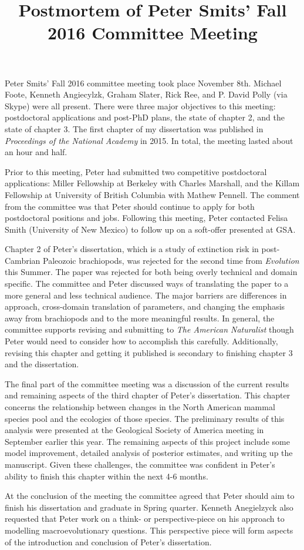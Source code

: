 \documentclass{article}
\title{Postmortem of Peter Smits' Fall 2016 Committee Meeting}
\date{}
\begin{document}
\linenumbers
\modulolinenumbers[2]

\maketitle

Peter Smits' Fall 2016 committee meeting took place November 8th. Michael Foote, Kenneth Angiecylzk, Graham Slater, Rick Ree, and P. David Polly (via Skype) were all present. There were three major objectives to this meeting: postdoctoral applications and post-PhD plans, the state of chapter 2, and the state of chapter 3. The first chapter of my dissertation was published in \textit{Proceedings of the National Academy} in 2015. In total, the meeting lasted about an hour and half. 

Prior to this meeting, Peter had submitted two competitive postdoctoral applications: Miller Fellowship at Berkeley with Charles Marshall, and the Killam Fellowship at University of British Columbia with Mathew Pennell. The comment from the committee was that Peter should continue to apply for both postdoctoral positions and jobs. Following this meeting, Peter contacted Felisa Smith (University of New Mexico) to follow up on a soft-offer presented at GSA.

Chapter 2 of Peter's dissertation, which is a study of extinction risk in post-Cambrian Paleozoic brachiopods, was rejected for the second time from \textit{Evolution} this Summer. The paper was rejected for both being overly technical and domain specific. The committee and Peter discussed ways of translating the paper to a more general and less technical audience. The major barriers are differences in approach, cross-domain translation of parameters, and changing the emphasis away from brachiopods and to the more meaningful results. In general, the committee supports revising and submitting to \textit{The American Naturalist} though Peter would need to consider how to accomplish this carefully. Additionally, revising this chapter and getting it published is secondary to finishing chapter 3 and the dissertation.

The final part of the committee meeting was a discussion of the current results and remaining aspects of the third chapter of Peter's dissertation. This chapter concerns the relationship between changes in the North American mammal species pool and the ecologies of those species. The preliminary results of this analysis were presented at the Geological Society of America meeting in September earlier this year. The remaining aspects of this project include some model improvement, detailed analysis of posterior estimates, and writing up the manuscript. Given these challenges, the committee was confident in Peter's ability to finish this chapter within the next 4-6 months. 

At the conclusion of the meeting the committee agreed that Peter should aim to finish his dissertation and graduate in Spring quarter. Kenneth Anegielzyck also requested that Peter work on a think- or perspective-piece on his approach to modelling macroevolutionary questions. This perspective piece will form aspects of the introduction and conclusion of Peter's dissertation.
\end{document}
